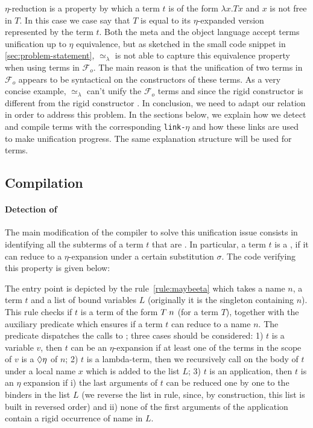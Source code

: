 \documentclass[sigconf,natbib=false,review]{acmart}
\newcommand{\appsep}{\ensuremath{\textcolor{lightgray}{\cdot}}}
\newcommand{\UnifRel}{\ensuremath{\simeq}}
\newcommand{\Ue}{\ensuremath{\UnifRel_\lambda}\xspace}
\newcommand{\linketa}{\texttt{link-}\ensuremath{\eta}\xspace}
\newcommand{\Fo}{\ensuremath{\mathcal{F}_{\!o}\xspace}} %
\begin{document}
$\eta$-reduction is a property by which a term $t$ is of the form $\lambda x. T
x$ and $x$ is not free in $T$. In this case we case say that $T$ is equal to its
$\eta$-expanded version represented by the term $t$. Both the meta and the
object language accept terms unification up to $\eta$ equivalence, but as
sketched in the small code snippet in \cref{sec:problem-statement}, \Ue is not
able to capture this equivalence property when using terms in \Fo. The main
reason is that the unification of two terms in \Fo{} appears to be syntactical
on the constructors of these terms. As a very concise example, \Ue can't unify
the \Fo{} terms  and  since the
rigid constructor  is different from the rigid constructor
. In conclusion, we need to adapt our  relation in
order to address this problem. In the sections below, we explain how we detect
and compile \maybeeta terms with the corresponding \linketa and how these links
are used to make unification progress. The same explanation structure will be 
used for \maybebeta terms.

\subsection{Compilation}

\paragraph{Detection of \maybeeta} The main modification of the compiler to solve this
unification issue consists in identifying all the subterms of a term $t$ that
are \maybeeta. In particular, a term $t$ is a \maybeeta, if it can reduce to a
$\eta$-expansion under a certain substitution $\sigma$. The code verifying this
property is given below:



The entry point is depicted by the rule~\ref{rule:maybeeta} which takes a name
$n$, a term $t$ and a list of bound variables $L$ (originally it is the
singleton containing $n$). This rule checks if $t$ is a term of the form $T
\appsep n$ (for a term $T$), together with the auxiliary predicate
 which ensures if a term $t$ can reduce to a name $n$.
The  predicate dispatches the calls to ;
three cases should be considered: 1) $t$ is a variable $v$, then $t$ can be an
$\eta$-expansion if at least one of the terms in the scope of $v$ is a
$\Diamond\eta$ of $n$; 2) $t$ is a lambda-term, then we recursively call
 on the body of $t$ under a local name $x$ which is added to
the list $L$; 3) $t$ is an application, then $t$ is an $\eta$ expansion if i)
the last arguments of $t$ can be reduced one by one to the binders in the list
$L$ (we reverse the list in rule, since, by construction, this list is built in
reversed order) and ii) none of the first arguments of the application contain a
rigid occurrence of name in $L$.
\end{document}
